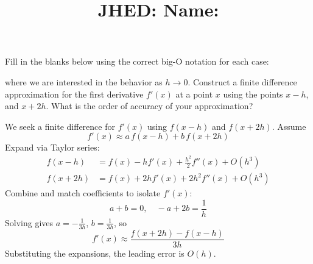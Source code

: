 \documentclass[reqno, answers]{exam}
\title{\normalsize{
  JHED: \underline{\hspace{4cm}} \hspace{1em} Name: \underline{\hspace{9cm}}}
   }
\author{}
\date{}
\begin{document}
\maketitle
\vspace{-2cm} %

\begin{questions}
  \question[4] 
  Fill in the blanks below using the correct big-O notation for each case:\vspace{1.5ex}
  where we are interested in the behavior as $h \to 0$.
  \question[8]
  Construct a finite difference approximation for the first derivative $f'(x)$ at a point $x$ using the points $x - h$, and $x + 2h$. What is the order of accuracy of your approximation?

  \begin{solution}
    We seek a finite difference for $f'(x)$ using $f(x-h)$ and $f(x+2h)$. Assume
    \[
      f'(x) \approx a\, f(x-h) + b\, f(x+2h)
    \]
    Expand via Taylor series:
    \begin{align*}
      f(x-h) &= f(x) - h f'(x) + \frac{h^2}{2} f''(x) + O(h^3) \\
      f(x+2h) &= f(x) + 2h f'(x) + 2h^2 f''(x) + O(h^3)
    \end{align*}
    Combine and match coefficients to isolate $f'(x)$:
    \[
      a + b = 0, \quad -a + 2b = \frac{1}{h}
    \]
    Solving gives $a = -\frac{1}{3h}$, $b = \frac{1}{3h}$, so
    \[
      f'(x) \approx \frac{f(x+2h) - f(x-h)}{3h}
    \]
    Substituting the expansions, the leading error is $O(h)$.


\end{solution}
\end{questions}
\end{document}
